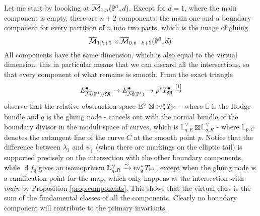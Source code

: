 Let me start by loooking at $\overline{\mathcal{M}}_{1,n}(\mathbb P^1,d)$. Except for $d=1$, where the main component is empty, there are $n+2$ components: the main one and a boundary component for every partition of $n$ into two parts, which is the image of gluing \[\overline{\mathcal{M}}_{1,k+1}\times\overline{\mathcal{M}}_{0,n-k+1}(\mathbb P^1,d).\]
All components have the same dimension, which is also equal to the virtual dimension; this in particular means that we can discard all the intersections, so that every component of what remains is smooth. From the exact triangle
\[ E^\bullet_{\overline{\mathcal{M}}(\mathbb P^1)/\mathfrak M}\rightarrow E^\bullet_{\overline{\mathcal{M}}(\mathbb P^1)}\rightarrow \rho^*T^\bullet_{\mathfrak M}\overset{[1]}{\rightarrow}\]
observe that the relative obstruction space $\mathbb E^\vee\boxtimes \operatorname{ev}_q^*T_{\mathbb P^1}$ - where $\mathbb E$ is the Hodge bundle and $q$ is the gluing node - cancels out with the normal bundle of the boundary divisor in the moduli space of curves, which is $\mathbb L_{q,E}^\vee\boxtimes \mathbb L_{q,R}^\vee$ - where $\mathbb L_{p,C}$ denotes the cotangent line of the curve $C$ at the smooth point $p$. Notice that the difference between $\lambda_1$ and $\psi_1$ (when there are markings on the elliptic tail) is supported precisely on the intersection with the other boundary components, while $\operatorname{d}\!f_q$ gives an isomoprhism $\mathbb L_{q,R}^\vee\xrightarrow{\sim}\operatorname{ev}_q^*T_{\mathbb P^1}$, except when the gluing node is a ramification point for the map, which only happens at the intersection with \emph{main} by Proposition \ref{prop:components}. This shows that the virtual class is the sum of the fundamental classes of all the components. Clearly no boundary component will contribute to the primary invariants.

